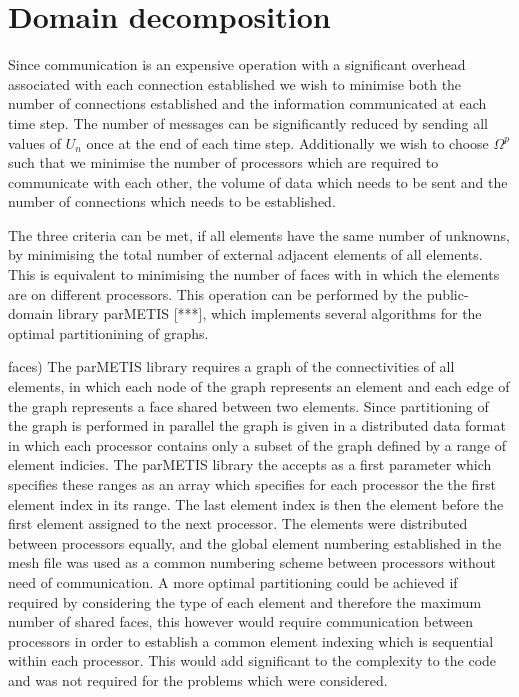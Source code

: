 \section{Domain decomposition}

Since communication is an expensive operation with a significant overhead associated with each connection established we wish to minimise both the number of connections established and the information communicated at each time step. The number of messages can be significantly reduced by sending all values of $U_{n}$ once at the end of each time step.
Additionally we wish to choose $\Omega^p$ such that we minimise the number of processors which are required to communicate with each other, the volume of data which needs to be sent and the number of connections which needs to be established.


The three criteria can be met, if all elements have the same number of unknowns, by minimising the total number of external adjacent elements of all elements. This is equivalent to minimising the number of faces with in which the elements are on different processors. This operation can be performed by the public-domain library parMETIS [***], which implements several algorithms for the optimal partitionining of graphs.

faces)
The parMETIS library requires a graph of the connectivities of all elements, in which each node of the graph represents an element and each edge of the graph represents a face shared between two elements. Since partitioning of the graph is performed in parallel the graph is given in a distributed data format in which each processor contains only a subset of the graph defined by a range of element indicies. The parMETIS library the accepts as a first parameter which specifies these ranges as an array which specifies for each processor the the first element index in its range. The last element index is then the element before the first element assigned to the next processor. The elements were distributed between processors equally, and the global element numbering established in the mesh file was used as a common numbering scheme between processors without need of communication.
A more optimal partitioning could be achieved if required by considering the type of each element and therefore the maximum number of shared faces, this however would require communication between processors in order to establish a common element indexing which is sequential within each processor. This would add significant to the complexity to the code and was not required for the problems which were considered.

